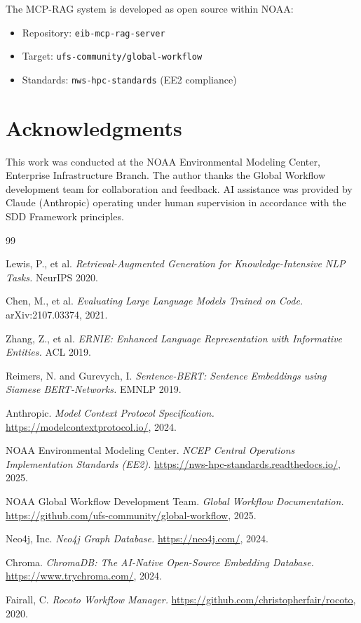 \documentclass[11pt,letterpaper]{article}
\begin{document}
The MCP-RAG system is developed as open source within NOAA:

\begin{itemize}
    \item Repository: \texttt{eib-mcp-rag-server}
    \item Target: \texttt{ufs-community/global-workflow}
    \item Standards: \texttt{nws-hpc-standards} (EE2 compliance)
\end{itemize}

\section*{Acknowledgments}

This work was conducted at the NOAA Environmental Modeling Center, Enterprise Infrastructure Branch. The author thanks the Global Workflow development team for collaboration and feedback. AI assistance was provided by Claude (Anthropic) operating under human supervision in accordance with the SDD Framework principles.

\begin{thebibliography}{99}

Lewis, P., et al.
\textit{Retrieval-Augmented Generation for Knowledge-Intensive NLP Tasks.}
NeurIPS 2020.

Chen, M., et al.
\textit{Evaluating Large Language Models Trained on Code.}
arXiv:2107.03374, 2021.

Zhang, Z., et al.
\textit{ERNIE: Enhanced Language Representation with Informative Entities.}
ACL 2019.

Reimers, N. and Gurevych, I.
\textit{Sentence-BERT: Sentence Embeddings using Siamese BERT-Networks.}
EMNLP 2019.

Anthropic.
\textit{Model Context Protocol Specification.}
\url{https://modelcontextprotocol.io/}, 2024.

NOAA Environmental Modeling Center.
\textit{NCEP Central Operations Implementation Standards (EE2).}
\url{https://nws-hpc-standards.readthedocs.io/}, 2025.

NOAA Global Workflow Development Team.
\textit{Global Workflow Documentation.}
\url{https://github.com/ufs-community/global-workflow}, 2025.

Neo4j, Inc.
\textit{Neo4j Graph Database.}
\url{https://neo4j.com/}, 2024.

Chroma.
\textit{ChromaDB: The AI-Native Open-Source Embedding Database.}
\url{https://www.trychroma.com/}, 2024.

Fairall, C.
\textit{Rocoto Workflow Manager.}
\url{https://github.com/christopherfair/rocoto}, 2020.

\end{thebibliography}
\end{document}
